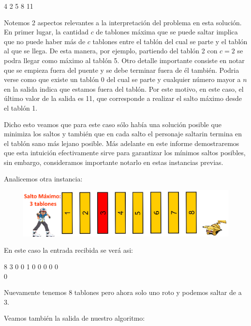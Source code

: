 \begin{addmargin}[4em]{0em}
\textsf{4 2 5 8 11} \\
\end{addmargin}

Notemos 2 aspectos relevantes a la interpretación del problema en esta solución. En primer lugar, la cantidad $c$ de tablones máxima que se puede saltar implica que no puede haber más de $c$ tablones entre el tablón del cual se parte y el tablón al que se llega. De esta manera, por ejemplo, partiendo del tablón 2 con $c=2$ se podra llegar como máximo al tablón 5. 
Otro detalle importante consiste en notar que se empieza fuera del puente y se debe terminar fuera de él también. Podria verse como que existe un tablón $0$ del cual se parte y cualquier número mayor a $n$ en la salida indica que estamos fuera del tablón. Por este motivo, en este caso, el último valor de la salida es 11, que corresponde a realizar el salto máximo desde el tablón 1. 

Dicho esto veamos que para este caso sólo había una solución posible que minimiza los saltos y también que en cada salto el personaje saltarin termina en el tablón sano más lejano posible. Más adelante en este informe demostraremos que esta intuición efectivamente sirve para garantizar los mínimos saltos posibles, sin embargo, consideramos importante notarlo en estas instancias previas.

Analicemos otra instancia:

\begin{figure}[H]
\centering
\includegraphics[scale=0.5]{ej1/tabl_3.png}
\end{figure}

En este caso la entrada recibida se verá asi: 

\begin{addmargin}[4em]{0em}
\textsf{8 3 0 0 1 0 0 0 0 0} \\
\textsf{0}
\end{addmargin}

Nuevamente tenemos 8 tablones pero ahora solo uno roto y podemos saltar de a 3. 

Veamos también la salida de nuestro algoritmo:

